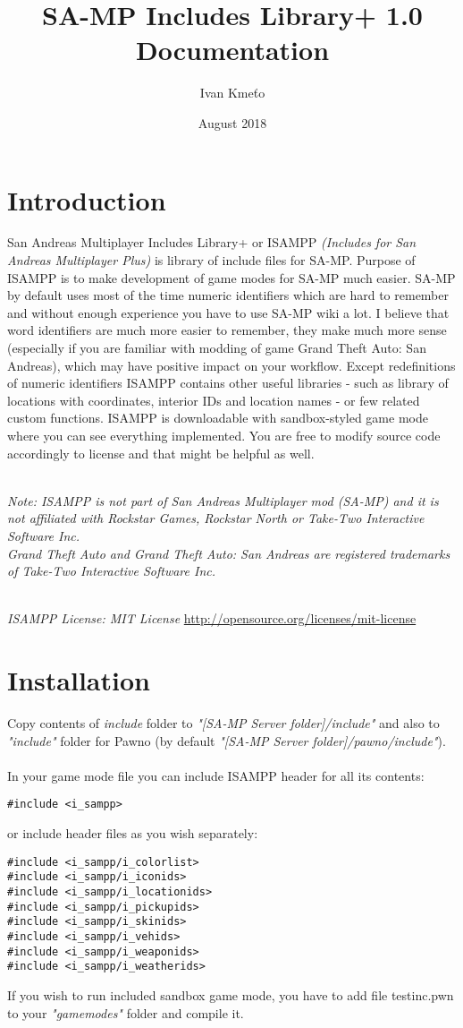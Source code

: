 \documentclass{article}
\title{SA-MP Includes Library+ 1.0 Documentation}
\author{Ivan Kmeťo}
\date{August 2018}
\begin{document}
\maketitle


\newpage
\section{Introduction}
San Andreas Multiplayer Includes Library+ or ISAMPP \textit{(Includes for San Andreas Multiplayer Plus)} is library of include files for SA-MP. Purpose of ISAMPP is to make development of game modes for SA-MP much easier. SA-MP by default uses most of the time numeric identifiers which are hard to remember and without enough experience you have to use SA-MP wiki a lot. I believe that word identifiers are much more easier to remember, they make much more sense (especially if you are familiar with modding of game Grand Theft Auto: San Andreas), which may have positive impact on your workflow. Except redefinitions of numeric identifiers ISAMPP contains other useful libraries - such as library of locations with coordinates, interior IDs and location names - or few related custom functions. ISAMPP is downloadable with sandbox-styled game mode where you can see everything implemented. You are free to modify source code accordingly to license and that might be helpful as well.

\textit{\\Note: ISAMPP is not part of San Andreas Multiplayer mod (SA-MP) and it is not affiliated with Rockstar Games, Rockstar North or Take-Two Interactive Software Inc.}
\textit{\\Grand Theft Auto and Grand Theft Auto: San Andreas are registered trademarks of
Take-Two Interactive Software Inc.}

\textit{\\ISAMPP License: MIT License} \url{http://opensource.org/licenses/mit-license}


\section{Installation}
Copy contents of \textit{include} folder to \textit{"[SA-MP Server folder]/include"} and also to \textit{"include"} folder for Pawno (by default \textit{"[SA-MP Server folder]/pawno/include"}).
\\
\\
In your game mode file you can include ISAMPP header for all its contents:
\begin{verbatim}
#include <i_sampp>
\end{verbatim}
or include header files as you wish separately:
\begin{verbatim}
#include <i_sampp/i_colorlist>
#include <i_sampp/i_iconids>
#include <i_sampp/i_locationids>
#include <i_sampp/i_pickupids>
#include <i_sampp/i_skinids>
#include <i_sampp/i_vehids>
#include <i_sampp/i_weaponids>
#include <i_sampp/i_weatherids>
\end{verbatim}
If you wish to run included sandbox game mode, you have to add file testinc.pwn to your \textit{"gamemodes"} folder and compile it. 
\end{document}
